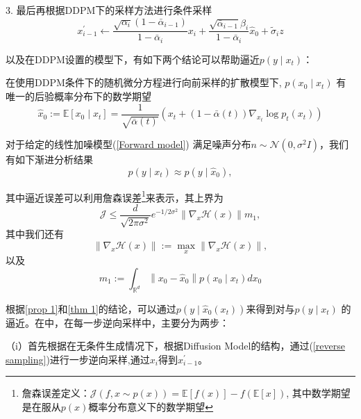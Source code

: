       
      3. 最后再根据DDPM下的采样方法进行条件采样
\begin{equation}
     {x}_{i-1}^{\prime} \leftarrow \frac{\sqrt{\alpha_i}\left(1-\bar{\alpha}_{i-1}\right)}{1-\bar{\alpha}_i} {x}_i+\frac{\sqrt{\bar{\alpha}_{i-1}} \beta_i}{1-\bar{\alpha}_i} \hat{{x}}_0+\tilde{\sigma}_i {z}
\end{equation}


以及在DDPM设置的模型下，有如下两个结论可以帮助逼近$p(y\mid x_t)$：

\begin{proposition}
\label{prop 1}
     在使用DDPM条件下的随机微分方程进行向前采样的扩散模型下, $p\left(x_0 \mid x_t\right)$ 有唯一的后验概率分布下的数学期望
$$
\hat{x}_0:=\mathbb{E}\left[x_0 \mid x_t\right]=\frac{1}{\sqrt{\bar{\alpha}(t)}}\left(x_t+(1-\bar{\alpha}(t)) \nabla_{x_t} \log p_t\left(x_t\right)\right)
$$
\end{proposition}
\begin{theorem}
\label{thm 1}
对于给定的线性加噪模型(\ref{Forward model}) 满足噪声分布${n} \sim \mathcal{N}\left(0, \sigma^2 {I}\right)$，我们有如下渐进分析结果
\begin{equation}
  p\left(y \mid x_t\right) \approx p\left(y \mid \hat{x}_0\right),
  \label{Thm 1 eq 1}
\end{equation}

其中逼近误差可以利用詹森误差\footnote{詹森误差定义：$\mathcal{J}(f,x\sim p(x)) = \mathbb{E}[f(x)]-f(\mathbb{E}[x])$, 其中数学期望是在服从$p(x)$概率分布意义下的数学期望}来表示，其上界为
\begin{equation}
\mathcal{J} \leq \frac{d}{\sqrt{2 \pi \sigma^2}} e^{-1 / 2 \sigma^2}\left\|\nabla_{x} \mathcal{H}(x)\right\| m_1,
    \label{upper bound thm 1}
\end{equation}
其中我们还有
\begin{equation}
    \left\|\nabla_{x} \mathcal{H}(x)\right\|:=\max _{x}\left\|\nabla_{x} \mathcal{H}(x)\right\|,
\end{equation}
以及
\begin{equation}
m_1:=\int_{\mathbb{R}^d}\left\|x_0-\hat{x}_0\right\| p\left(x_0 \mid x_t\right) d x_0  
\end{equation}
\end{theorem}
根据\ref{prop 1}和\ref{thm 1}的结论，可以通过$p(y\mid \hat{x}_0(x_t))$来得到对与$p(y\mid x_t)$
的逼近。在\cite{Inverse}中，在每一步逆向采样中，主要分为两步：   

（i）首先根据在无条件生成情况下，根据Diffusion Model的结构，通过(\ref{reverse sampling})进行一步逆向采样,通过$x_i$得到$x_{i-1}^{\prime}$。    

